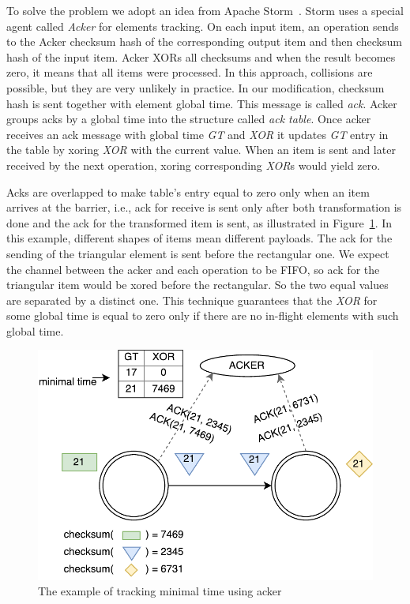 To solve the problem we adopt an idea from Apache Storm~\cite{apache:storm}. Storm uses a special agent called {\em Acker} for elements tracking. On each input item, an operation sends to the Acker checksum hash of the corresponding output item and then checksum hash of the input item. Acker XORs all checksums and when the result becomes zero, it means that all items were processed. In this approach, collisions are possible, but they are very unlikely in practice. In our modification, checksum hash is sent together with element global time. This message is called {\it ack}. Acker groups acks by a global time into the structure called {\it ack table}. Once acker receives an ack message with global time {\it GT} and {\it XOR} it updates {\it GT} entry in the table by xoring {\it XOR} with the current value. When an item is sent and later received by the next operation, xoring corresponding {\it XOR}s would yield zero.

Acks are overlapped to make table's entry equal to zero only when an item arrives at the barrier, i.e., ack for receive is sent only after both transformation is done and the ack for the transformed item is sent, as illustrated in Figure~\ref{acker}. In this example, different shapes of items mean different payloads. The ack for the sending of the triangular element is sent before the rectangular one. We expect the channel between the acker and each operation to be FIFO, so ack for the triangular item would be xored before the rectangular. So the two equal values are separated by a distinct one. This technique guarantees that the {\it XOR} for some global time is equal to zero only if there are no in-flight elements with such global time.

\begin{figure}[htbp]
  \centering
  \includegraphics[scale=0.58]{pics/acker}
  \caption{The example of tracking minimal time using acker}
  \label {acker}
\end{figure}

